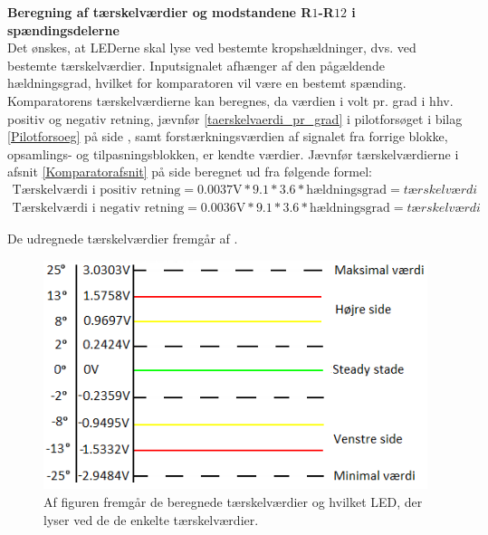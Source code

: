 \noindent\textbf{Beregning af tærskelværdier og modstandene R$1$-R$12$ i spændingsdelerne} \\
Det ønskes, at LEDerne skal lyse ved bestemte kropshældninger, dvs. ved bestemte tærskelværdier. Inputsignalet afhænger af den pågældende hældningsgrad, hvilket for komparatoren vil være en bestemt spænding. Komparatorens tærskelværdierne kan beregnes, da værdien i volt pr. grad i hhv. positiv og negativ retning, jævnfør \eqref{taerskelvaerdi_pr_grad} i pilotforsøget i bilag \ref{Pilotforsoeg} på side \pageref{Sec_Pilot_Data}, samt forstærkningsværdien af signalet fra forrige blokke, opsamlings- og tilpasningsblokken, er kendte værdier. Jævnfør tærskelværdierne i afsnit \ref{Komparatorafsnit} på side \pageref{Komparatorafsnit} beregnet ud fra følgende formel:
\begin{eqnarray} \label{pr_grad} 
\text{Tærskelværdi i positiv retning} = {0.0037\text{V}*9.1*3.6*\text{hældningsgrad}} = tærskelværdi \\
\text{Tærskelværdi i negativ retning} = {0.0036\text{V}*9.1*3.6*\text{hældningsgrad}} = tærskelværdi
\end{eqnarray}

De udregnede tærskelværdier fremgår af . 
\begin{figure}[H]
	\centering
	\includegraphics[scale=1.]{figures/cProblemloesning/Taerskelvaerdier.PNG}
	\caption{Af figuren fremgår de beregnede tærskelværdier og hvilket LED, der lyser ved de de enkelte tærskelværdier.}
	\label{fig:taerskelvaerdier}
\end{figure}

